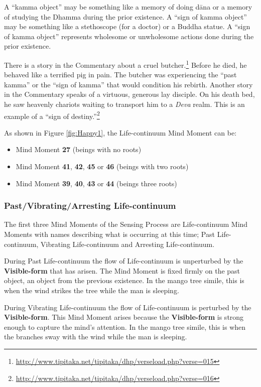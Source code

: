 \pagebreak

A “kamma object” may be something like a memory of doing dāna or a memory of studying the Dhamma during the prior existence. A “sign of kamma object” may be something like a stethoscope (for a doctor) or a Buddha statue. A “sign of kamma object” represents wholesome or unwholesome actions done during the prior existence. 

There is a story in the Commentary about a cruel butcher.\footnote{\url{http://www.tipitaka.net/tipitaka/dhp/verseload.php?verse=015}} Before he died, he behaved like a terrified pig in pain. The butcher was experiencing the “past kamma” or the “sign of kamma” that would condition his rebirth. Another story in the Commentary speaks of a virtuous, generous lay disciple. On his death bed, he saw heavenly chariots waiting to transport him to a \textit{Deva} realm. This is an example of a “sign of destiny.”\footnote{\url{http://www.tipitaka.net/tipitaka/dhp/verseload.php?verse=016}}

As shown in Figure \ref{fig:Happy1}, the Life-continuum Mind Moment can be:
\begin{itemize}[nosep]
\item Mind Moment \textbf{27} (beings with no roots)
\item Mind Moment \textbf{41}, \textbf{42}, \textbf{45} or \textbf{46} (beings with two roots)
\item Mind Moment \textbf{39}, \textbf{40}, \textbf{43} or \textbf{44} (beings three roots)
\end{itemize}

\subsubsection*{Past/Vibrating/Arresting Life-continuum}

The first three Mind Moments of the Sensing Process are Life-continuum Mind Moments with names describing what is occurring at this time; Past Life-continuum, Vibrating Life-continuum and Arresting Life-continuum.

During Past Life-continuum the flow of Life-continuum is unperturbed by the \textbf{Visible-form} that has arisen. The Mind Moment is fixed firmly on the past object, an object from the previous existence. In the mango tree simile, this is when the wind strikes the tree while the man is sleeping.

During Vibrating Life-continuum the flow of Life-continuum is perturbed by the \textbf{Visible-form}. This Mind Moment arises because the \textbf{Visible-form} is strong enough to capture the mind’s attention. In the mango tree simile, this is when the branches sway with the wind while the man is sleeping.

